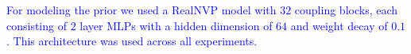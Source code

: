 \documentclass{article}
\theoremstyle{plain}
\theoremstyle{definition}
\theoremstyle{remark}
\newcommand{\dan}[1]{{{\textcolor{blue}{ {#1}\textbf{}}}}}
\begin{document}
\dan{For modeling the prior we used a RealNVP \cite{dinh2016density} model with $32$ coupling blocks, each consisting of $2$ layer MLPs with a hidden dimension of $64$ and weight decay of $0.1$. This architecture was used across all experiments.}

\label{Experiments}





        
        
        
\end{document}
